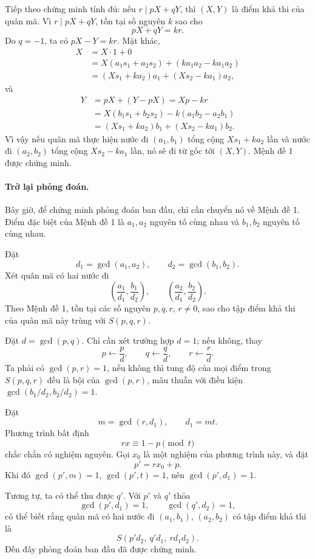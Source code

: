 \documentclass[11pt]{article}
\begin{document}
Tiếp theo chứng minh tính đủ: nếu \(r\mid pX+qY\), thì \((X,Y)\) là điểm khả
thi của quân mã. Vì \(r\mid pX+qY\), tồn tại số nguyên \(k\) sao cho
\[
  pX+qY=kr.
\]
Do \(q=-1\), ta có \(pX-Y=kr\). Mặt khác,
\[
\begin{aligned}
  X
  &=X\cdot 1+0\\
  &=X(a_1s_1+a_2s_2)+(ka_1a_2-ka_1a_2)\\
  &=(Xs_1+ka_2)a_1+(Xs_2-ka_1)a_2,
\end{aligned}
\]
và
\[
\begin{aligned}
  Y
  &=pX+(Y-pX)=Xp-kr\\
  &=X(b_1s_1+b_2s_2)-k(a_1b_2-a_2b_1)\\
  &=(Xs_1+ka_2)b_1+(Xs_2-ka_1)b_2.
\end{aligned}
\]
Vì vậy nếu quân mã thực hiện nước đi \((a_1,b_1)\) tổng cộng
\(Xs_1+ka_2\) lần và nước đi \((a_2,b_2)\) tổng cộng \(Xs_2-ka_1\) lần, nó sẽ
đi từ gốc tới \((X,Y)\). Mệnh đề 1 được chứng minh.

\paragraph{Trở lại phỏng đoán.}
Bây giờ, để chứng minh phỏng đoán ban đầu, chỉ cần chuyển nó về Mệnh đề 1.
Điểm đặc biệt của Mệnh đề 1 là \(a_1,a_2\) nguyên tố cùng nhau và
\(b_1,b_2\) nguyên tố cùng nhau.

Đặt
\[
  d_1=\gcd(a_1,a_2),\qquad d_2=\gcd(b_1,b_2).
\]
Xét quân mã có hai nước đi
\[
  \left(\frac{a_1}{d_1},\frac{b_1}{d_2}\right),\qquad
  \left(\frac{a_2}{d_1},\frac{b_2}{d_2}\right).
\]
Theo Mệnh đề 1, tồn tại các số nguyên \(p,q,r\), \(r\ne 0\), sao cho tập điểm
khả thi của quân mã này trùng với \(S(p,q,r)\).

Đặt \(d=\gcd(p,q)\). Chỉ cần xét trường hợp \(d=1\); nếu không, thay
\[
  p\leftarrow \frac pd,\qquad q\leftarrow \frac qd,\qquad r\leftarrow \frac rd.
\]
Ta phải có \(\gcd(p,r)=1\), nếu không thì tung độ của mọi điểm trong
\(S(p,q,r)\) đều là bội của \(\gcd(p,r)\), mâu thuẫn với điều kiện
\(\gcd(b_1/d_2,b_2/d_2)=1\).

Đặt
\[
  m=\gcd(r,d_1),\qquad d_1=mt.
\]
Phương trình bất định
\[
  rx\equiv 1-p\pmod t
\]
chắc chắn có nghiệm nguyên. Gọi \(x_0\) là một nghiệm của phương trình này,
và đặt
\[
  p'=rx_0+p.
\]
Khi đó \(\gcd(p',m)=1\), \(\gcd(p',t)=1\), nên \(\gcd(p',d_1)=1\).

Tương tự, ta có thể thu được \(q'\). Với \(p'\) và \(q'\) thỏa
\[
  \gcd(p',d_1)=1,\qquad \gcd(q',d_2)=1,
\]
có thể biết rằng quân mã có hai nước đi \((a_1,b_1)\), \((a_2,b_2)\) có tập
điểm khả thi là
\[
  S(p'd_2,\ q'd_1,\ rd_1d_2).
\]
Đến đây phỏng đoán ban đầu đã được chứng minh.
\end{document}
